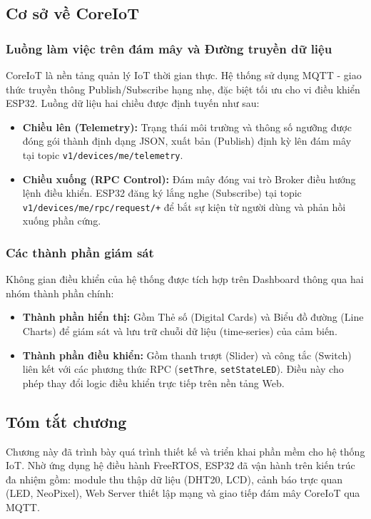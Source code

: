 \subsection{Cơ sở về CoreIoT}
\subsubsection{Luồng làm việc trên đám mây và Đường truyền dữ liệu}
CoreIoT là nền tảng quản lý IoT thời gian thực. Hệ thống sử dụng MQTT - giao thức truyền thông Publish/Subscribe hạng nhẹ, đặc biệt tối ưu cho vi điều khiển ESP32. Luồng dữ liệu hai chiều được định tuyến như sau:

\begin{itemize}
    \item \textbf{Chiều lên (Telemetry):} Trạng thái môi trường và thông số ngưỡng được đóng gói thành định dạng JSON, xuất bản (Publish) định kỳ lên đám mây tại topic \texttt{v1/devices/me/telemetry}.
    \item \textbf{Chiều xuống (RPC Control):} Đám mây đóng vai trò Broker điều hướng lệnh điều khiển. ESP32 đăng ký lắng nghe (Subscribe) tại topic \texttt{v1/devices/me/rpc/request/+} để bắt sự kiện từ người dùng và phản hồi xuống phần cứng.
\end{itemize}

\subsubsection{Các thành phần giám sát}
Không gian điều khiển của hệ thống được tích hợp trên Dashboard thông qua hai nhóm thành phần chính:
\begin{itemize}
    \item \textbf{Thành phần hiển thị:} Gồm Thẻ số (Digital Cards) và Biểu đồ đường (Line Charts) để giám sát và lưu trữ chuỗi dữ liệu (time-series) của cảm biến.
    \item \textbf{Thành phần điều khiển:} Gồm thanh trượt (Slider) và công tắc (Switch) liên kết với các phương thức RPC (\texttt{setThre}, \texttt{setStateLED}). Điều này cho phép thay đổi logic điều khiển trực tiếp trên nền tảng Web.
\end{itemize}


\subsection{Tóm tắt chương}
Chương này đã trình bày quá trình thiết kế và triển khai phần mềm cho hệ thống IoT. Nhờ ứng dụng hệ điều hành FreeRTOS, ESP32 đã vận hành trên kiến trúc đa nhiệm gồm: module thu thập dữ liệu (DHT20, LCD), cảnh báo trực quan (LED, NeoPixel), Web Server thiết lập mạng và giao tiếp đám mây CoreIoT qua MQTT. 





